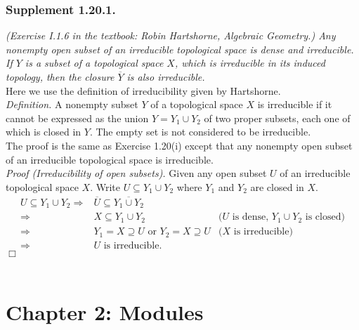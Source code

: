 \documentclass{article}
\begin{document}
\subsubsection*{Supplement 1.20.1.}
\emph{(Exercise I.1.6 in the textbook: Robin Hartshorne, Algebraic Geometry.)
Any nonempty open subset of an irreducible topological space is dense and irreducible.
If $Y$ is a subset of a topological space $X$, which is irreducible in its induced topology,
then the closure $\overline{Y}$ is also irreducible.} \\

Here we use the definition of irreducibility given by Hartshorne. \\

\emph{Definition.}
A nonempty subset $Y$ of a topological space $X$ is irreducible
if it cannot be expressed as the union $Y = Y_1 \cup Y_2$ of two proper subsets,
each one of which is closed in $Y$. The empty set is not considered to be irreducible. \\

The proof is the same as Exercise 1.20(i) except
that any nonempty open subset of an irreducible topological space is irreducible. \\

\emph{Proof (Irreducibility of open subsets).}
Given any open subset $U$ of an irreducible topological space $X$.
Write $U \subseteq Y_1 \cup Y_2$ where $Y_1$ and $Y_2$ are closed in $X$.
  \begin{align*}
  U \subseteq Y_1 \cup Y_2
  \Longrightarrow&
  \overline{U} \subseteq \overline{Y_1 \cup Y_2} \\
  \Longrightarrow&
  X \subseteq Y_1 \cup Y_2
    &\text{($U$ is dense, $Y_1 \cup Y_2$ is closed)} \\
  \Longrightarrow&
  Y_1 = X \supseteq U \text{ or } Y_2 = X \supseteq U
    &\text{($X$ is irreducible)} \\
  \Longrightarrow&
  \text{$U$ is irreducible.}
  \end{align*}
$\Box$ \\\\






\newpage
\section*{Chapter 2: Modules \\}
\end{document}
